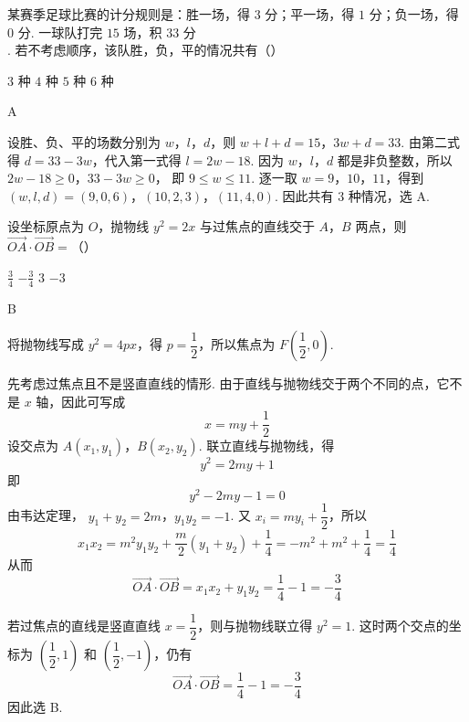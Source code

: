 \begin{problem}
某赛季足球比赛的计分规则是：胜一场，得 \(3\text{ 分}\)；平一场，得 \(1\text{ 分}\)；负一场，得 \(0\text{ 分}\). 一球队打完 \(15\text{ 场}\)，积 \(33\text{ 分}\). 若不考虑顺序，该队胜，负，平的情况共有（\quad）

\choices
    {\(3\text{ 种}\)}
    {\(4\text{ 种}\)}
    {\(5\text{ 种}\)}
    {\(6\text{ 种}\)}
\end{problem}

\begin{answer}
A
\end{answer}

\begin{solution}
设胜、负、平的场数分别为 \(w\)，\(l\)，\(d\)，则
\(w+l+d=15\)，\(3w+d=33\).
由第二式得 \(d=33-3w\)，代入第一式得 \(l=2w-18\). 因为 \(w\)，\(l\)，\(d\) 都是非负整数，所以
\(2w-18\geqslant0\)，\(33-3w\geqslant0\)，
即 \(9\leqslant w\leqslant11\). 逐一取 \(w=9\)，\(10\)，\(11\)，得到
\((w,l,d)=(9,0,6)\)，\((10,2,3)\)，\((11,4,0)\).
因此共有 \(3\) 种情况，选 A.
\end{solution}

\begin{problem}
设坐标原点为 \(O\)，抛物线 \(y^2=2x\) 与过焦点的直线交于 \(A\)，\(B\) 两点，则 \(\overrightarrow{OA}\cdot\overrightarrow{OB}=\)（\quad）

\choices
    {\(\frac{3}{4}\)}
    {\(-\frac{3}{4}\)}
    {\(3\)}
    {\(-3\)}
\end{problem}

\begin{answer}
B
\end{answer}

\begin{solution}
将抛物线写成 \(y^2=4px\)，得 \(p=\dfrac12\)，所以焦点为 \(F\left(\dfrac12,0\right)\).

先考虑过焦点且不是竖直直线的情形. 由于直线与抛物线交于两个不同的点，它不是 \(x\) 轴，因此可写成
\[
x=my+\frac12
\]
设交点为 \(A(x_1,y_1)\)，\(B(x_2,y_2)\). 联立直线与抛物线，得
\[
y^2=2my+1
\]
即
\[
y^2-2my-1=0
\]
由韦达定理，
\(y_1+y_2=2m\)，\(y_1y_2=-1\).
又 \(x_i=my_i+\dfrac12\)，所以
\[
x_1x_2=m^2y_1y_2+\frac m2(y_1+y_2)+\frac14
=-m^2+m^2+\frac14=\frac14
\]
从而
\[
\overrightarrow{OA}\cdot\overrightarrow{OB}=x_1x_2+y_1y_2=\frac14-1=-\frac34
\]

若过焦点的直线是竖直直线 \(x=\dfrac12\)，则与抛物线联立得 \(y^2=1\). 这时两个交点的坐标为
\(\left(\dfrac12,1\right)\) 和 \(\left(\dfrac12,-1\right)\)，仍有
\[
\overrightarrow{OA}\cdot\overrightarrow{OB}=\frac14-1=-\frac34
\]
因此选 B.
\end{solution}

